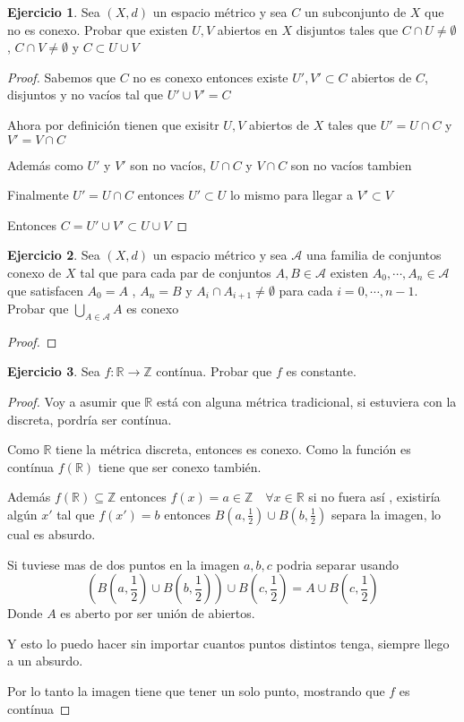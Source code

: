 \documentclass[11pt]{report}
\newcommand{\R}{\mathbb{R}}
\newcommand{\Z}{\mathbb{Z}}
\newcommand{\ra}{\rightarrow}
\theoremstyle{definition}
\newtheorem{ej}{Ejercicio}
\begin{document}
\begin{ej}
	Sea $(X,d)$ un espacio métrico y sea $C$ un subconjunto de $X$ que no es conexo. Probar que existen $U,V$ abiertos en $X$ disjuntos tales que $C \cap U \neq \emptyset$ , $C \cap V \neq \emptyset$ y $C \subset U \cup V$
	\begin{proof}
		Sabemos que $C$ no es conexo entonces existe $U',V' \subset C$ abiertos de $C$, disjuntos y no vacíos tal que $U' \cup V' = C$

		Ahora por definición tienen que exisitr $U,V$ abiertos de $X$ tales que $U' = U \cap C$ y $V' = V \cap C$ 

		Además como $U'$ y $V'$ son no vacíos, $U \cap C$ y $V \cap C$ son no vacíos tambien

		Finalmente $U' = U \cap C$ entonces $U' \subset U$ lo mismo para llegar a $V' \subset V$

		Entonces $C = U' \cup V' \subset U \cup V$
	\end{proof}
\end{ej}
\begin{ej}
	Sea $(X,d)$ un espacio métrico y sea $\mathcal{A}$ una familia de conjuntos conexo de $X$ tal que para cada par de conjuntos $A,B \in \mathcal{A}$ existen $A_0 , \cdots , A_n \in \mathcal{A}$ que satisfacen $A_0 = A$ , $A_n = B$ y $A_i \cap A_{i+1} \neq \emptyset$ para cada $i =0,\cdots , n-1$. Probar que $\bigcup_{A \in \mathcal{A}} A$ es conexo

	\begin{proof}
	
	\end{proof}

\end{ej}

\begin{ej}
	Sea $f: \R \ra \Z$ contínua. Probar que $f$ es constante.
	\begin{proof}

		Voy a asumir que $\R$ está con alguna métrica tradicional, si estuviera con la discreta, pordría ser contínua.

		Como $\R$ tiene la métrica discreta, entonces es conexo. Como la función es contínua $f(\R)$ tiene que ser conexo también.

		Además $f(\R) \subseteq \Z$ entonces $f(x) = a \in \Z \quad \forall x \in \R$ si no fuera así , existiría algún $x'$ tal que $f(x' ) = b$ entonces $B(a,\frac{1}{2}) \cup B(b,\frac{1}{2})$ separa la imagen, lo cual es absurdo. 

		Si tuviese mas de dos puntos en la imagen $a,b,c$ podria separar usando $$(B(a,\frac{1}{2}) \cup B(b,\frac{1}{2})) \cup B(c,\frac{1}{2}) = A \cup B(c,\frac{1}{2})$$ Donde $A$ es aberto por ser unión de abiertos.

		Y esto lo puedo hacer sin importar cuantos puntos distintos tenga, siempre llego a un absurdo.

		Por lo tanto la imagen tiene que tener un solo punto, mostrando que $f$ es contínua
		
	\end{proof}
\end{ej}
\end{document}
